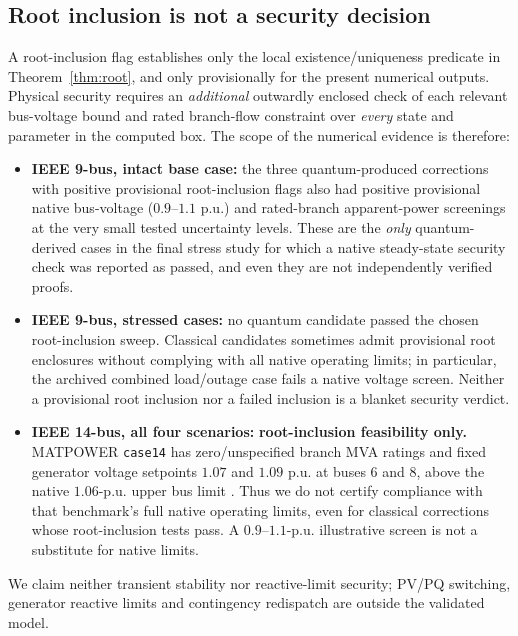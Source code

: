 \documentclass[11pt,a4paper]{article}
\theoremstyle{remark}\newtheorem{remark}[theorem]{Remark}
\begin{document}
\subsection{Root inclusion is not a security decision}
A root-inclusion flag establishes only the local existence/uniqueness predicate in Theorem~\ref{thm:root}, and only provisionally for the present numerical outputs. Physical security requires an \emph{additional} outwardly enclosed check of each relevant bus-voltage bound and rated branch-flow constraint over \emph{every} state and parameter in the computed box. The scope of the numerical evidence is therefore:
\begin{itemize}\setlength{\itemsep}{2pt}
\item \textbf{IEEE 9-bus, intact base case:} the three quantum-produced corrections with positive provisional root-inclusion flags also had positive provisional native bus-voltage ($0.9$--$1.1$ p.u.) and rated-branch apparent-power screenings at the very small tested uncertainty levels. These are the \emph{only} quantum-derived cases in the final stress study for which a native steady-state security check was reported as passed, and even they are not independently verified proofs.
\item \textbf{IEEE 9-bus, stressed cases:} no quantum candidate passed the chosen root-inclusion sweep. Classical candidates sometimes admit provisional root enclosures without complying with all native operating limits; in particular, the archived combined load/outage case fails a native voltage screen. Neither a provisional root inclusion nor a failed inclusion is a blanket security verdict.
\item \textbf{IEEE 14-bus, all four scenarios:} \textbf{root-inclusion feasibility only.} MATPOWER \texttt{case14} has zero/unspecified branch MVA ratings and fixed generator voltage setpoints $1.07$ and $1.09$ p.u. at buses 6 and 8, above the native $1.06$-p.u. upper bus limit \citep{matpowercase14}. Thus we do not certify compliance with that benchmark's full native operating limits, even for classical corrections whose root-inclusion tests pass. A $0.9$--$1.1$-p.u. illustrative screen is not a substitute for native limits.
\end{itemize}
We claim neither transient stability nor reactive-limit security; PV/PQ switching, generator reactive limits and contingency redispatch are outside the validated model.
\end{document}
